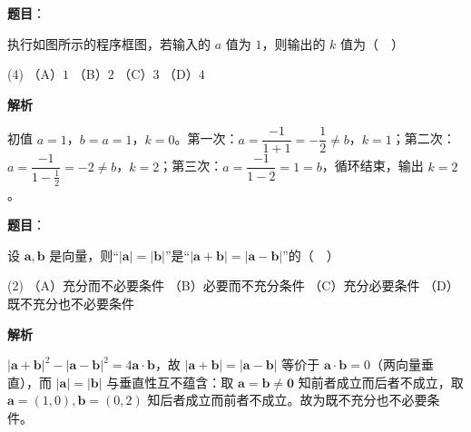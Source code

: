 \begin{answer}

\textbf{题目}：

执行如图所示的程序框图，若输入的 \(a\) 值为 \(1\)，则输出的 \(k\) 值为（　）
\nopagebreak[4]
\begin{center}\end{center}
\nopagebreak[4]
\begin{gkopts}(4)
\task （A）\(1\)
\task （B）\(2\)
\task （C）\(3\)
\task （D）\(4\)
\end{gkopts}

\textbf{解析}

初值 \(a=1\)，\(b=a=1\)，\(k=0\)。第一次：\(a=\dfrac{-1}{1+1}=-\dfrac12\neq b\)，\(k=1\)；第二次：\(a=\dfrac{-1}{1-\frac12}=-2\neq b\)，\(k=2\)；第三次：\(a=\dfrac{-1}{1-2}=1=b\)，循环结束，输出 \(k=2\)。


\end{answer}
\begin{answer}

\textbf{题目}：

设 \(\boldsymbol{a},\boldsymbol{b}\) 是向量，则“\(|\boldsymbol{a}|=|\boldsymbol{b}|\)”是“\(|\boldsymbol{a}+\boldsymbol{b}|=|\boldsymbol{a}-\boldsymbol{b}|\)”的（　）

\begin{gkopts}(2)
\task （A）充分而不必要条件
\task （B）必要而不充分条件
\task （C）充分必要条件
\task （D）既不充分也不必要条件
\end{gkopts}

\textbf{解析}

\(|\boldsymbol a+\boldsymbol b|^2-|\boldsymbol a-\boldsymbol b|^2=4\boldsymbol a\cdot\boldsymbol b\)，故 \(|\boldsymbol a+\boldsymbol b|=|\boldsymbol a-\boldsymbol b|\) 等价于 \(\boldsymbol a\cdot\boldsymbol b=0\)（两向量垂直），而 \(|\boldsymbol a|=|\boldsymbol b|\) 与垂直性互不蕴含：取 \(\boldsymbol a=\boldsymbol b\neq\boldsymbol 0\) 知前者成立而后者不成立，取 \(\boldsymbol a=(1,0),\boldsymbol b=(0,2)\) 知后者成立而前者不成立。故为既不充分也不必要条件。


\end{answer}
